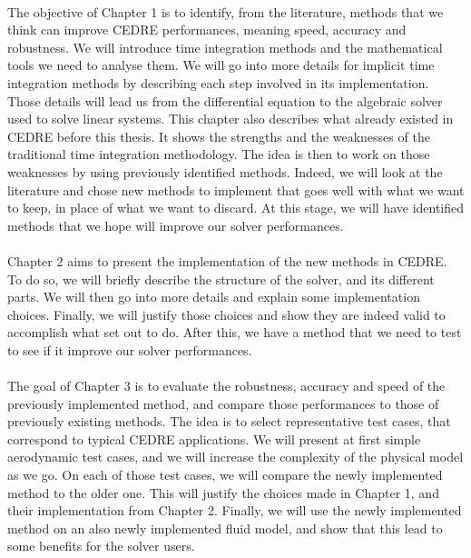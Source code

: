     \paragraph{}
    The objective of Chapter 1 is to identify, from the literature, methods that we think can improve CEDRE performances, meaning speed, accuracy and robustness.
    We will introduce time integration methods and the mathematical tools we need to analyse them.
    We will go into more details for implicit time integration methods by describing each step involved in its implementation.
    Those details will lead us from the differential equation to the algebraic solver used to solve linear systems.
    This chapter also describes what already existed in CEDRE before this thesis.
    It shows the strengths and the weaknesses of the traditional time integration methodology.
    The idea is then to work on those weaknesses by using previously identified methods.
    Indeed, we will look at the literature and chose new methods to implement that goes well with what we want to keep, in place of what we want to discard.
    At this stage, we will have identified methods that we hope will improve our solver performances.

    \paragraph{}
    Chapter 2 aims to present the implementation of the new methods in CEDRE.
    To do so, we will briefly describe the structure of the solver, and its different parts.
    We will then go into more details and explain some implementation choices.
    Finally, we will justify those choices and show they are indeed valid to accomplish what set out to do.
    After this, we have a method that we need to test to see if it improve our solver performances.

    \paragraph{}
    The goal of Chapter 3 is to evaluate the robustness, accuracy and speed of the previously implemented method, and compare those performances to those of previously existing methods.
    The idea is to select representative test cases, that correspond to typical CEDRE applications.
    We will present at first simple aerodynamic test cases, and we will increase the complexity of the physical model as we go.
    On each of those test cases, we will compare the newly implemented method to the older one.
    This will justify the choices made in Chapter 1, and their implementation from Chapter 2.
    Finally, we will use the newly implemented method on an also newly implemented fluid model, and show that this lead to some benefits for the solver users.

